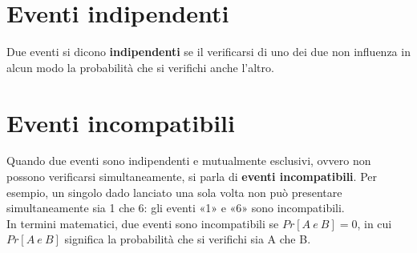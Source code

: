 \documentclass[drafts, 10pt]{book}
\begin{document}
\section{Eventi indipendenti}
Due eventi si dicono \textbf{indipendenti} se il verificarsi di uno dei due non influenza in alcun modo la probabilità che si verifichi anche l'altro.

\section{Eventi incompatibili}
Quando due eventi sono indipendenti e mutualmente esclusivi, ovvero non possono verificarsi simultaneamente, si parla di \textbf{eventi incompatibili}. Per esempio, un singolo dado lanciato una sola volta non può presentare simultaneamente sia 1 che 6: gli eventi «1» e «6» sono incompatibili.
\\
In termini matematici, due eventi sono incompatibili se $Pr[A\ e\ B]=0$, in cui $Pr[A\ e\ B]$ significa la probabilità che si verifichi sia A che B.
\end{document}
